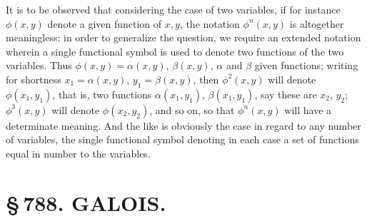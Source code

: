 \documentclass[11pt,a4paper]{article}
\begin{document}
It is to be observed that considering the case of two variables, if for instance $\phi(x, y)$ denote a given function of $x, y$, the notation $\phi^{n}(x, y)$ is altogether meaningless: in order to generalize the question, we require an extended notation wherein a single functional symbol is used to denote two functions of the two variables. Thus $\phi(x, y) = \alpha(x, y)$, $\beta(x, y)$, $\alpha$ and $\beta$ given functions; writing for shortness $x_{1} = \alpha(x, y)$, $y_{1} = \beta(x, y)$, then $\phi^{2}(x, y)$ will denote $\phi(x_{1}, y_{1})$, that is, two functions $\alpha(x_{1}, y_{1})$, $\beta(x_{1}, y_{1})$, say these are $x_{2}$, $y_{2}$; $\phi^{3}(x, y)$ will denote $\phi(x_{2}, y_{2})$, and so on, so that $\phi^{n}(x, y)$ will have a determinate meaning. And the like is obviously the case in regard to any number of variables, the single functional symbol denoting in each case a set of functions equal in number to the variables.

\newpage
\section*{\S\,788. GALOIS.}


\smallskip
\end{document}
